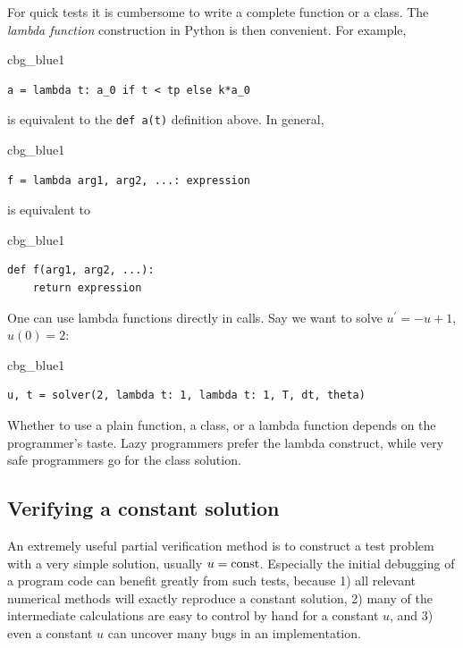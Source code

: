 \documentclass[%
oneside,                 %
final,                   %
10pt]{article}
\newenvironment{_cod_tight}[1]{
   \def\FrameCommand{\colorbox{#1}}
   \FrameRule0.6pt\MakeFramed {\FrameRestore}\vskip3mm}
   {\vskip0mm\endMakeFramed}
\newenvironment{cod}[1]{
\bgroup\rmfamily
\fboxsep=0mm\relax
\begin{_cod_tight}{#1}
\list{}{\parsep=-2mm\parskip=0mm\topsep=0pt\leftmargin=2mm
\rightmargin=2\leftmargin\leftmargin=4pt\relax}
\item\relax}
{\endlist\end{_cod_tight}\egroup}
\begin{document}
For quick tests it is cumbersome to write a complete function or a class.
The \emph{lambda function} construction in Python is then convenient. For example,
\begin{cod}{cbg_blue1}\begin{Verbatim}[numbers=none,fontsize=\fontsize{9pt}{9pt},baselinestretch=0.95,xleftmargin=2mm]
a = lambda t: a_0 if t < tp else k*a_0
\end{Verbatim}
\end{cod}
\noindent
is equivalent to the \texttt{def a(t)} definition above. In general,
\begin{cod}{cbg_blue1}\begin{Verbatim}[numbers=none,fontsize=\fontsize{9pt}{9pt},baselinestretch=0.95,xleftmargin=2mm]
f = lambda arg1, arg2, ...: expression
\end{Verbatim}
\end{cod}
\noindent
is equivalent to
\begin{cod}{cbg_blue1}\begin{Verbatim}[numbers=none,fontsize=\fontsize{9pt}{9pt},baselinestretch=0.95,xleftmargin=2mm]
def f(arg1, arg2, ...):
    return expression
\end{Verbatim}
\end{cod}
\noindent
One can use lambda functions directly in calls. Say we want to
solve $u^{\prime}=-u+1$, $u(0)=2$:
\begin{cod}{cbg_blue1}\begin{Verbatim}[numbers=none,fontsize=\fontsize{9pt}{9pt},baselinestretch=0.95,xleftmargin=2mm]
u, t = solver(2, lambda t: 1, lambda t: 1, T, dt, theta)
\end{Verbatim}
\end{cod}
\noindent

Whether to use a plain function, a class, or a lambda function depends
on the programmer's taste. Lazy programmers prefer the lambda construct, while
very safe programmers go for the class solution.

\subsection{Verifying a constant solution}
\label{decay:verify:trivial}

An extremely useful partial verification method is to construct a test
problem with a very simple solution, usually $u=\hbox{const}$.
Especially the initial debugging of a program code can benefit greatly
from such tests, because 1) all relevant numerical methods will
exactly reproduce a constant solution, 2) many of the intermediate
calculations are easy to control by hand for a constant $u$, and 3) even a
constant $u$ can uncover many bugs in an implementation.
\end{document}
